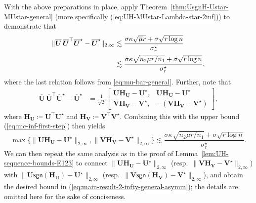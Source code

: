 With the above preparations in place, 
%
apply Theorem~\ref{thm:UsgnH-Ustar-MUstar-general} (more specifically (\ref{eq:UH-MUstar-Lambda-star-2inf}))
 to demonstrate that
 \begin{align}
\|\overline{\bm{U}}\,\overline{\bm{U}}^{\top}\overline{\bm{U}}^{\star}-\overline{\bm{U}}^{\star}\|_{2,\infty} & \lesssim\frac{\sigma\kappa\sqrt{\overline{\mu}r}+\sigma\sqrt{r\log n}}{\sigma_{r}^{\star}} \notag\\
 & \lesssim \frac{\sigma\kappa\sqrt{n_{2}\mu r/n_{1}}+\sigma\sqrt{r\log n}}{\sigma_{r}^{\star}}, 
	 \label{eq:mc-inf-first-step}
\end{align}
%
where the last relation follows from \eqref{eq:mu-bar-general}. Further, note that 
%
\begin{align*}
\overline{\bm{U}}\,\overline{\bm{U}}^{\top}\overline{\bm{U}}^{\star}-\overline{\bm{U}}^{\star} & =\frac{1}{\sqrt{2}}\left[\begin{array}{cc}
\bm{U}\bm{H}_{\bm{U}}-\bm{U}^{\star}, & \bm{U}\bm{H}_{\bm{U}}-\bm{U}^{\star}\\
\bm{V}\bm{H}_{\bm{V}}-\bm{V}^{\star}, & -(\bm{V}\bm{H}_{\bm{V}}-\bm{V}^{\star})
\end{array}\right],
\end{align*}
%
where $\bm{H}_{\bm{U}}\coloneqq \bm{U}^{\top} \bm{U}^{\star}$ and $\bm{H}_{\bm{V}}\coloneqq \bm{V}^{\top} \bm{V}^{\star}$. Combining this with the upper bound (\ref{eq:mc-inf-first-step}) then yields
%
\[
	\max\big\{\|\bm{U}\bm{H}_{\bm{U}}-\bm{U}^{\star}\|_{2,\infty},\|\bm{V}\bm{H}_{\bm{V}}-\bm{V}^{\star}\|_{2,\infty} \big\}
	\lesssim \frac{\sigma\kappa\sqrt{n_{2}\mu r/n_{1}}+\sigma\sqrt{r\log n}}{\sigma_{r}^{\star}}.
\]
%
We can then repeat the same analysis  as in the proof of Lemma~\ref{lem:UH-sequence-bounds-E123}
to connect $\|\bm{U}\bm{H}_{\bm{U}}-\bm{U}^{\star}\|_{2,\infty}$
(resp.~$\|\bm{V}\bm{H}_{\bm{V}}-\bm{V}^{\star}\|_{2,\infty}$)
with $\|\bm{U}\mathsf{sgn}(\bm{H}_{\bm{U}})-\bm{U}^{\star}\|_{2,\infty}$
(resp.~$\|\bm{V}\mathsf{sgn}(\bm{H}_{\bm{V}})-\bm{V}^{\star}\|_{2,\infty}$),
and obtain the desired bound in (\ref{eq:main-result-2-infty-general-asymm}); the details are omitted here for the sake of conciseness. 


